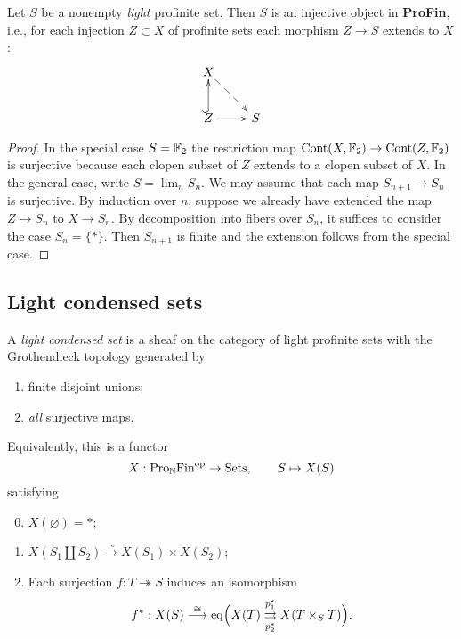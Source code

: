 \documentclass{notes}
\begin{document}
\begin{prop}
Let $S$ be a nonempty {\em light} profinite set. Then $S$ is an
injective object in {\bf ProFin}, i.e., for each injection $Z\subset
X$ of profinite sets each morphism $Z\to S$ extends to $X$: 
$$
\xymatrix{
  X \ar@{-->}[rd] \\ 
  Z \ar@{^{(}->}[u] \ar[r] & S
}
$$
\end{prop}

\begin{proof}
In the special case $S={\mathbb{F}}_2$ the restriction map
${\rm Cont}(X,{\mathbb{F}}_2)\to{\rm Cont}(Z,{\mathbb{F}}_2)$ is surjective because each clopen
subset of $Z$ extends to a clopen subset of $X$. 
In the general case, write $S=\lim_n S_n$. We may assume that each map
$S_{n+1}\to S_n$ is surjective. By induction over $n$, suppose we
already have extended the map $Z\to S_n$ to $X\to S_n$. By
decomposition into fibers over $S_n$, it suffices to consider the case
$S_n=\{*\}$. Then $S_{n+1}$ is finite and the extension follows
from the special case. 
\end{proof}

\subsection{Light condensed sets}

\begin{defi}
A {\em light condensed set} is a sheaf on the category of light
profinite sets with the Grothendieck topology generated by
\begin{enumerate}
\item finite disjoint unions;
\item {\em all} surjective maps.
\end{enumerate}
Equivalently, this is a functor 
$$
  X: \text{Pro}_{\mathbb{N}}\text{Fin}^{\rm op} \to \text{Sets},\qquad S\mapsto X(S)
$$
satisfying
\begin{enumerate}
\setcounter{enumi}{-1}
\item $X(\varnothing)=*$;
\item $X(S_1\amalg S_2)\stackrel{\sim}\longrightarrow X(S_1)\times X(S_2)$;
\item Each surjection $f:T\twoheadrightarrow S$ induces an isomorphism
$$
  f^*:X(S) \stackrel{\cong}\longrightarrow {\rm eq}\Bigl(X(T)
  \overset{p_1^*}{\underset{p_2^*}{\rightrightarrows}} X(T\times_ST)\Bigr).
$$
\end{enumerate}
\end{defi}
\end{document}
